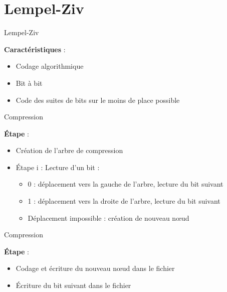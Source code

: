 \documentclass[french]{beamer}
\begin{document}
\section{Lempel-Ziv}
\begin{frame}{Lempel-Ziv}
	\begin{center}
	\textbf{Caractéristiques} :
	\begin{itemize}
	\item<2-4>  Codage algorithmique
	\item<3-4>  Bit à bit 
	\item <4>  Code des suites de bits sur le moins de place possible
	\end{itemize}
	\end{center}
\end{frame}


\begin{frame}{Compression}
	\begin{center}
	\textbf{Étape} :
	\begin{itemize}
	\item<2-6>  Création de l'arbre de compression
	\item<3-6>  Étape i : Lecture d'un bit :
			\begin{itemize}
				\item<4-6> 0 : déplacement vers la gauche de l'arbre, lecture du bit suivant
				\item<5-6> 1 : déplacement vers la droite de l'arbre, lecture du bit suivant
				\item<6-6> Déplacement impossible : création de nouveau nœud 
			\end{itemize}
	\end{itemize}
	\end{center}
\end{frame}
	
\begin{frame}{Compression}
	\begin{center}
	\textbf{Étape} :
	\begin{itemize}
	\item<1-2>  Codage et écriture du nouveau nœud dans le fichier
	\item<2> Écriture du bit suivant dans le fichier
	\end{itemize}
	\end{center}
\end{frame}
\end{document}
